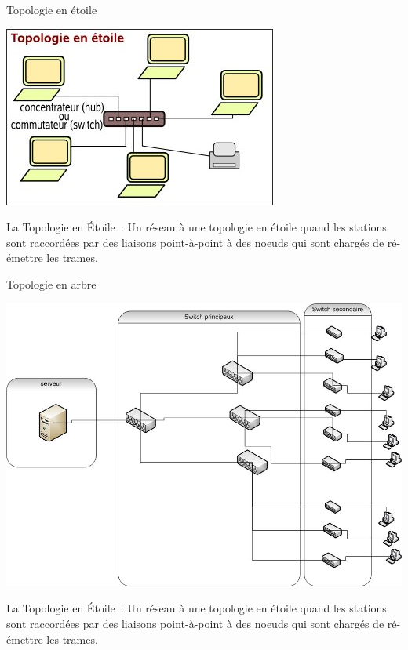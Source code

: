 \documentclass{beamer}
\begin{document}
	\begin{frame}{Topologie en étoile}
		\begin{center}
			\includegraphics[scale = 0.6]{Etoile.jpg}
		\end{center}
		La Topologie en Étoile : Un réseau à une topologie en étoile quand les stations sont raccordées par des liaisons point-à-point à des noeuds qui sont chargés de ré-émettre les trames.
	\end{frame}

	\begin{frame}{Topologie en arbre}
		\begin{center}
			\includegraphics[scale = 0.3]{Arbre.jpg}
		\end{center}
			La Topologie en Étoile : Un réseau à une topologie en étoile quand les stations sont raccordées par des liaisons point-à-point à des noeuds qui sont chargés de ré-émettre les trames.
	\end{frame}
\end{document}
